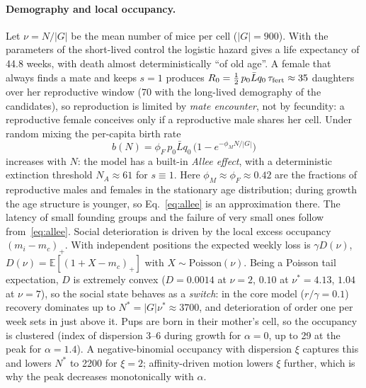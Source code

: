 \paragraph{Demography and local occupancy.}
Let $\nu=N/|G|$ be the mean number of mice per cell ($|G|=900$). With the parameters of the short-lived control the logistic hazard
gives a life expectancy of 44.8 weeks, with death almost deterministically ``of old age''. A female that always
finds a mate and keeps $s=1$ produces $R_0=\tfrac12\,p_0\bar L q_0\,\tau_{\rm fert}\approx35$ daughters over her
reproductive window (70 with the long-lived demography of the candidates), so reproduction is limited by
\emph{mate encounter}, not by fecundity: a reproductive female conceives only if a reproductive male shares her
cell. Under random mixing the per-capita birth rate
\begin{equation}
 b(N)=\phi_F\,p_0\bar L q_0\,\bigl(1-e^{-\phi_M N/|G|}\bigr)
 \label{eq:allee}
\end{equation}
increases with $N$: the model has a built-in \emph{Allee effect}, with a deterministic extinction threshold
$N_A\approx61$ for $s\equiv1$. Here $\phi_M\approx\phi_F\approx0.42$ are the fractions of reproductive males and
females in the stationary age distribution; during growth the age structure is younger, so
Eq.~\eqref{eq:allee} is an approximation there. The latency of small founding groups and the failure of very small
ones follow from~\eqref{eq:allee}.
Social deterioration is driven by the local excess occupancy $(m_i-m_c)_+$. With independent positions the expected
weekly loss is $\gamma D(\nu)$, $D(\nu)=\mathbb E[(1+X-m_c)_+]$ with $X\sim\mathrm{Poisson}(\nu)$. Being a Poisson
tail expectation, $D$ is extremely convex ($D=0.0014$ at $\nu=2$, $0.10$ at $\nu^*=4.13$, $1.04$ at $\nu=7$), so
the social state behaves as a \emph{switch}: in the core model ($r/\gamma=0.1$) recovery dominates up to
$N^*=|G|\nu^*\approx3700$, and deterioration of order one per week sets in just above it. Pups are born in their
mother's cell, so the occupancy is clustered (index of dispersion 3--6 during growth for $\alpha=0$, up to 29 at the
peak for $\alpha=1.4$). A negative-binomial occupancy with dispersion $\xi$ captures this and lowers $N^*$ to 2200
for $\xi=2$; affinity-driven motion lowers $\xi$ further, which is why the peak decreases monotonically with
$\alpha$.

